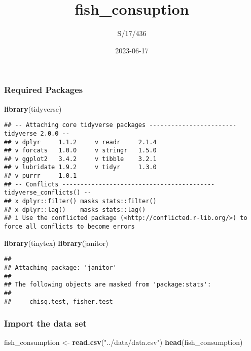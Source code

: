 \documentclass[
]{article}
\title{fish\_consuption}
\author{S/17/436}
\date{2023-06-17}
\newenvironment{Shaded}{\begin{snugshade}}{\end{snugshade}}
\newcommand{\FunctionTok}[1]{\textcolor[rgb]{0.13,0.29,0.53}{\textbf{#1}}}
\newcommand{\NormalTok}[1]{#1}
\newcommand{\OtherTok}[1]{\textcolor[rgb]{0.56,0.35,0.01}{#1}}
\newcommand{\StringTok}[1]{\textcolor[rgb]{0.31,0.60,0.02}{#1}}
\begin{document}
\maketitle

\hypertarget{required-packages}{%
\subsubsection{Required Packages}\label{required-packages}}

\begin{Shaded}
\begin{Highlighting}[]
\FunctionTok{library}\NormalTok{(tidyverse)}
\end{Highlighting}
\end{Shaded}

\begin{verbatim}
## -- Attaching core tidyverse packages ------------------------ tidyverse 2.0.0 --
## v dplyr     1.1.2     v readr     2.1.4
## v forcats   1.0.0     v stringr   1.5.0
## v ggplot2   3.4.2     v tibble    3.2.1
## v lubridate 1.9.2     v tidyr     1.3.0
## v purrr     1.0.1     
## -- Conflicts ------------------------------------------ tidyverse_conflicts() --
## x dplyr::filter() masks stats::filter()
## x dplyr::lag()    masks stats::lag()
## i Use the conflicted package (<http://conflicted.r-lib.org/>) to force all conflicts to become errors
\end{verbatim}

\begin{Shaded}
\begin{Highlighting}[]
\FunctionTok{library}\NormalTok{(tinytex)}
\FunctionTok{library}\NormalTok{(janitor)}
\end{Highlighting}
\end{Shaded}

\begin{verbatim}
## 
## Attaching package: 'janitor'
## 
## The following objects are masked from 'package:stats':
## 
##     chisq.test, fisher.test
\end{verbatim}

\hypertarget{import-the-data-set}{%
\subsubsection{Import the data set}\label{import-the-data-set}}

\begin{Shaded}
\begin{Highlighting}[]
\NormalTok{fish\_consumption }\OtherTok{\textless{}{-}} \FunctionTok{read.csv}\NormalTok{(}\StringTok{"../data/data.csv"}\NormalTok{)}
\FunctionTok{head}\NormalTok{(fish\_consumption)}
\end{Highlighting}
\end{Shaded}
\end{document}
